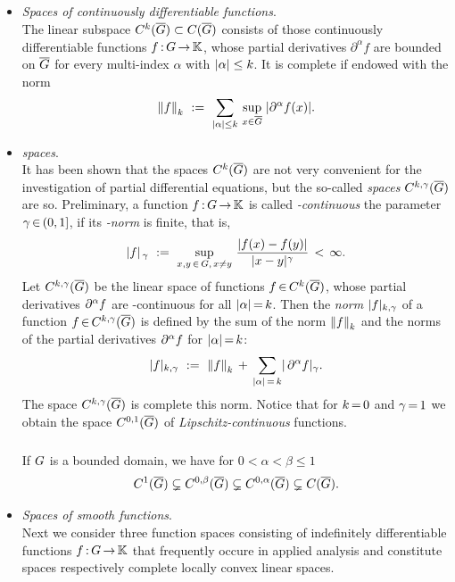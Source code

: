 \documentclass[11pt,twoside]{article}
\begin{document}
\subparagraph{}
\begin{itemize}[leftmargin=12pt,itemsep=5pt]
\item[5.] \textit{Spaces of continuously differentiable functions}.\\
The linear subspace $C^k(\overline{G}) \subset C(\overline{G})$
consists of those continuously differentiable functions $f{\,:\,}G {\,\to\,} {\mathbb{K}}$,
whose partial derivatives $\partial^{\alpha} f$ are bounded on $\overline{G}$
for every multi-index $\alpha$ with $\abs{\alpha} \leq k$.
It is complete if endowed with the norm
\[
\norm{f}_k
\, \eqdef \,
\sum_{\abs{\alpha} \leq k} \,
\sup_{x \in \clG } \; \abs{\partial^{\alpha} f(x)} .
\]

\item[6.] \textit{{\HOELDER} spaces}.\\
It has been shown
that the spaces $C^k(\overline{G})$ are not very convenient
for the investigation of partial differential equations,
but the so-called \textit{{\HOELDER} spaces} $C^{k,\gamma}(\overline{G})$ are so.
Preliminary,
a function $f{\,:\,}G {\,\to\,} {\mathbb{K}}$ is called \textit{{\HOELDER}-continuous}
{\wrt} the parameter $\gamma {\,\in\,} (0,1]$,
if its \textit{{\HOELDER}-norm} is finite,
that is,
\[
\abs{f} _{\,\gamma} \, \eqdef \,
\sup_{x,y \, \in \, \G, \, x \neq y} \,
\frac{\abs{f(x) - f(y)} } {\abs{x-y} ^{\gamma}} \, < \, \infty.
\]
Let $C^{k,\gamma}(\overline{G})$ be the linear space
of functions $f {\,\in\,} C^k(\overline{G})$,
whose partial derivatives $\partial^{\alpha} f$
are {\HOELDER}-continuous for all $\abs{\alpha} \eq k$.
Then the \textit{{\HOELDER} norm} $\abs{f} _{k,\gamma}$
of a function $f {\,\in\,} C^{k,\gamma}(\overline{G})$ is defined
by the sum of the norm $\left\lVert f \right\rVert_k$
and the {\HOELDER} norms of the partial derivatives $\partial^{\alpha} f$
for $\abs{\alpha} \eq k$:
\[
\abs{f} _{k,\gamma}
\, \eqdef \,
\norm{f}_k
\, + \,
\sum_{\abs{\alpha} \eq k} \abs{\,\PA f} _\gamma.
\]
The space $C^{k,\gamma}(\overline{G})$ is complete {\wrt} this norm.
Notice that for $k {\,=\,} 0$ and $\gamma {\,=\,} 1$ we obtain the space
$C^{0,1}(\overline{G})$ of \textit{Lipschitz-continuous} functions.

\subparagraph{}
If $G$ is a bounded domain, we have for $0 < \alpha < \beta \leq 1$
\[
C^1(\overline{G}) \subsetneq
C^{0,\beta}(\overline{G}) \subsetneq
C^{0,\alpha}(\overline{G}) \subsetneq
C(\overline{G}).
\]

\item[7.] \textit{Spaces of smooth functions}.\\
Next we consider three function spaces
consisting of indefinitely differentiable functions $f{\,:\,}G {\,\to\,} {\mathbb{K}}$
that frequently occure in applied analysis
and constitute {\FRECHET} spaces respectively
complete locally convex linear spaces.


\end{itemize}
\end{document}

